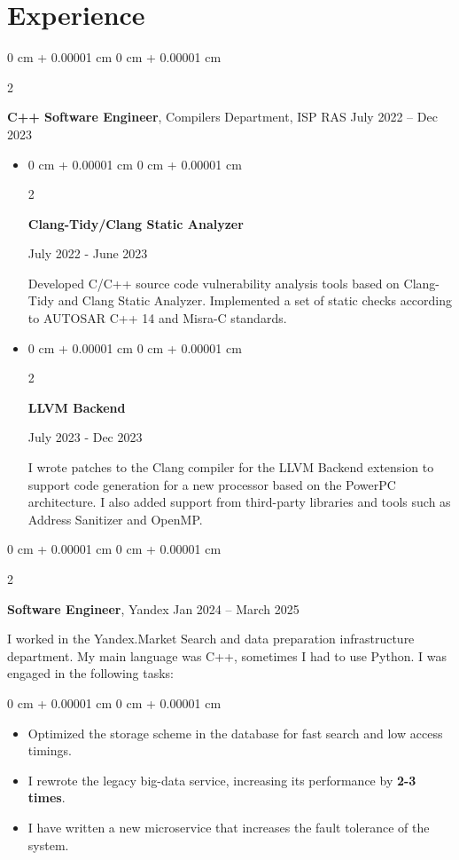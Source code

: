 \documentclass[10pt, letterpaper]{article}
\newenvironment{highlights}{
    \begin{itemize}[
        topsep=0.10 cm,
        parsep=0.10 cm,
        partopsep=0pt,
        itemsep=0pt,
        leftmargin=0 cm + 10pt
    ]
}{
    \end{itemize}
} %
\newenvironment{onecolentry}{
    \begin{adjustwidth}{
        0 cm + 0.00001 cm
    }{
        0 cm + 0.00001 cm
    }
}{
    \end{adjustwidth}
} %
\newenvironment{twocolentry}[2][]{
    \onecolentry
    \def\secondColumn{#2}
    \setcolumnwidth{\fill, 4.5 cm}
    \begin{paracol}{2}
}{
    \switchcolumn \raggedleft \secondColumn
    \end{paracol}
    \endonecolentry
} %
\begin{document}
    
    \section{Experience}
    \begin{twocolentry}{
            July 2022 – Dec 2023
        }
            \textbf{C++ Software Engineer}, Compilers Department, ISP RAS  \end{twocolentry}
    
        \vspace{0.10 cm}

        \begin{itemize}[label={}]

        \item \begin{twocolentry} {
            July 2022 - June 2023
        }
            \textbf{{Clang-Tidy/Clang Static Analyzer}}
        \end{twocolentry}

        Developed C/C++ source code vulnerability analysis tools based on Clang-Tidy and Clang Static
Analyzer. Implemented a set of static checks according to AUTOSAR C++ 14 and Misra-C standards.

        \item \begin{twocolentry} {
            July 2023 - Dec 2023
        }
            \textbf{{LLVM Backend}}
        \end{twocolentry}
I wrote patches to the Clang compiler for the LLVM Backend extension to support
code generation for a new processor based on the PowerPC architecture. I also added support from third-party
libraries and tools such as Address Sanitizer and OpenMP.

        \end{itemize}

        \vspace{0.4 cm}
\begin{twocolentry}{
            Jan 2024 – March 2025
        }
            \textbf{Software Engineer}, Yandex\end{twocolentry}
            \vspace{0.10 cm}
I worked in the Yandex.Market Search and data preparation infrastructure department. My main language was C++, sometimes I had to use Python. I was engaged in the following
tasks:
        \vspace{0.10 cm}
        \begin{onecolentry}
            \begin{highlights}
                \item Optimized the storage scheme in the database for fast search and low access timings.
                \item I rewrote the legacy big-data service, increasing its performance by \textbf{2-3 times}.
                \item I have written a new microservice that increases the fault tolerance of the system.
            \end{highlights}
        \end{onecolentry}
\end{document}
